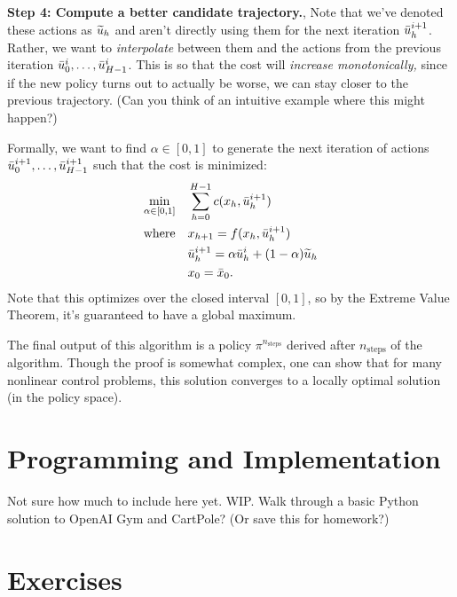 \documentclass[\main/main]{subfiles}
\begin{document}
\textbf{Step 4: Compute a better candidate trajectory.},
Note that we've denoted these actions as $\widetilde {u}_h$ and aren't directly using them for the next iteration $\bar {u}^{i+1}_h$.
Rather, we want to \emph{interpolate} between them and the actions from the previous iteration $\bar {u}^i_0, \dots, \bar {u}^i_{H-1}$.
This is so that the cost will \emph{increase monotonically,} since if the new policy turns out to actually be worse, we can stay closer to the previous trajectory. (Can you think of an intuitive example where this might happen?)

Formally, we want to find $\alpha \in [0, 1]$ to generate the next iteration of actions $\bar {u}^{i+1}_0, \dots, \bar {u}^{i+1}_{H-1}$ such that the cost is minimized:
\begin{align*}
    \min_{\alpha \in [0, 1]} \quad & \sum_{h=0}^{H-1} c(x_h, \bar {u}^{i+1}_h) \\
    \text{where} \quad & x_{h+1} = f(x_h, \bar {u}^{i+1}_h) \\
    & \bar {u}^{i+1}_h = \alpha \bar {u}^i_h + (1-\alpha) \widetilde {u}_h \\
    & x_0 = \bar {x}_0.
\end{align*}
Note that this optimizes over the closed interval $[0, 1]$, so by the Extreme Value Theorem, it's guaranteed to have a global maximum.

The final output of this algorithm is a policy $\pi^{n_\text{steps}}$ derived after $n_\text{steps}$ of the algorithm.
Though the proof is somewhat complex, one can show that for many nonlinear control problems, this solution converges to a locally optimal solution (in the policy space).

\iffalse
\section{Programming and Implementation}

Not sure how much to include here yet. WIP. Walk through a basic Python solution
to OpenAI Gym and CartPole? (Or save this for homework?)



\section{Exercises}
\end{document}
